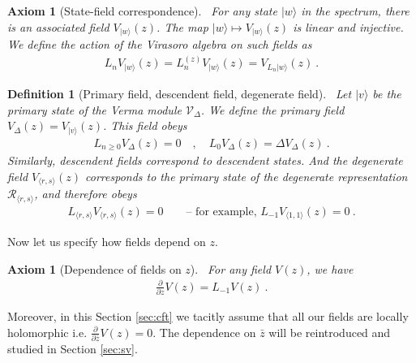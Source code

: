 \documentclass[12pt, a4paper]{article}
\theoremstyle{break}
\newtheorem{hyp}[exo]{Axiom}
\newtheorem{defn}[exo]{Definition}
\begin{document}
\begin{hyp}[State-field correspondence]
 ~\label{hyp:sfc}
For any state $|w\rangle$ in the spectrum, there is an associated field $V_{|w\rangle}(z)$. The map $|w\rangle \mapsto V_{|w\rangle}(z)$ is linear and injective. We define the action of the Virasoro algebra on such fields as 
\begin{align}
 L_n V_{|w\rangle}(z) =  L_n^{(z)} V_{|w\rangle}(z) = V_{L_n|w\rangle}(z)\ .
\end{align}
\end{hyp}

\begin{defn}[Primary field, descendent field, degenerate field]
~\label{def:pfdf}
Let $|v\rangle$ be the primary state of the Verma module $\mathcal V_\Delta$.
We define the primary field $V_\Delta(z)=V_{|v\rangle}(z)$. This field obeys
\begin{align}
 L_{n\geq 0} V_\Delta(z) = 0 \quad , \quad L_0 V_\Delta(z) = \Delta V_\Delta(z)\ .
\end{align}
Similarly, descendent fields correspond to descendent states. And the degenerate field $V_{\langle r,s\rangle}(z)$ corresponds to the primary state of the degenerate representation $\mathcal{R}_{\langle r,s\rangle}$, and therefore obeys 
\begin{align}
 L_{\langle r, s\rangle} V_{\langle r,s\rangle}(z) = 0\qquad \text{-- for example, \ } L_{-1}V_{\langle 1,1\rangle}(z) = 0\ .
\end{align}
\end{defn}

Now let us specify how fields depend on $z$. 

\begin{hyp}[Dependence of fields on $z$]
 ~\label{hyp:geom}
 For any field $V(z)$, we have 
 \begin{align}
  \frac{\partial}{\partial z} V(z) = L_{-1} V(z)  \ .
  \label{pvlv}
 \end{align}
\end{hyp}
Moreover, in this Section \ref{sec:cft} we tacitly assume that all our fields are locally holomorphic i.e. $\frac{\partial}{\partial \bar z} V(z) = 0$. The dependence on $\bar z$ will be reintroduced and studied in Section \ref{sec:sv}.
\end{document}
